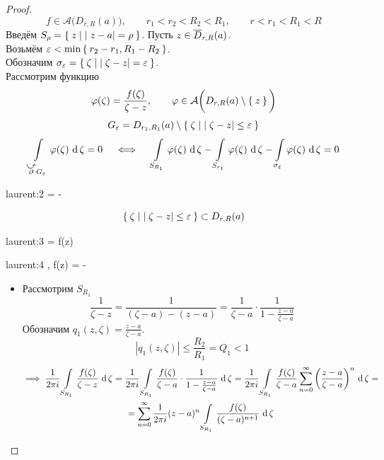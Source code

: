 \begin{proof}
	$$ f \in \mathcal A \bigg( D_{r, R}(a) \bigg), \qquad r_1 < r_2 < R_2 < R_1, \qquad r < r_1 < R_1 < R $$
	Введём $ S_\rho = \Set{ z \mid |z - a| = \rho} $.
	Пусть $ z \in \overline D_{r, R}(a) $. \\
	Возьмём $ \varepsilon < \min\Set{ r_2 - r_1, R_1 - R_2} $. \\
	Обозначим $ \sigma_\varepsilon = \Set{\zeta \mid |\zeta - z| = \varepsilon} $. \\
	Рассмотрим функцию
	$$ \varphi(\zeta) = \frac{f(\zeta)}{\zeta - z}, \qquad \varphi \in \mathcal A \bigg( D_{r, R}(a) \setminus \Set{z} \bigg) $$
	$$ G_\varepsilon = D_{r_1, R_1}(a) \setminus \Set{\zeta \mid |\zeta - z| \le \varepsilon} $$
	$$ \cint[\zeta]{\curvedir \partial G_\eps}{\vphi(\zeta)} = 0 \quad
	\iff \quad \cint[\zeta]{S_{R_1}}{\vphi(\zeta)} - \cint[\zeta]{S_{r_1}}{\vphi(\zeta)} - \cint[\zeta]{\sigma_\eps}{\vphi(\zeta)} = 0 $$
	\begin{equ}{laurent:2}
		\implies {}  =  - 
	\end{equ}
	$$ \Set{\zeta \mid |\zeta - z| \le \varepsilon} \subset D_{r, R}(a) $$
	\begin{equ}{laurent:3}
		 = f(z)
	\end{equ}
	\begin{equ}{laurent:4}
		,  \implies f(z) =   - 
	\end{equ}
	\begin{itemize}
		\item Рассмотрим $ S_{R_1} $
			$$ \frac1{\zeta - z} = \frac1{(\zeta - a) - (z - a)} = \frac1{\zeta - a} \cdot \frac1{1 - \frac{z - a}{\zeta - a}} $$
			Обозначим $ q_1(z, \zeta) = \frac{z - a}{\zeta - a} $.
			$$ |q_1(z, \zeta)| \le \frac{R_2}{R_1} = Q_1 < 1 $$
			\begin{multline}\lbl{laurent:6}
				\implies \frac1{2\pi i} \cint[\zeta]{S_{R_1}}{\frac{f(\zeta)}{\zeta - z}} = \frac1{2\pi i}\cint[\zeta]{S_{R_1}}{\frac{f(\zeta)}{\zeta - a} \cdot \frac1{1 - \frac{z - a}{\zeta - a}}} = \frac1{2\pi i}\cint[\zeta]{S_{R_1}}{\frac{f(\zeta)}{\zeta - a} \sum_{n = 0}^\infty \bigg( \frac{z - a}{\zeta - a} \bigg)^n} = \\
				= \sum_{n = 0}^\infty \frac1{2\pi i}(z - a)^n \cint[\zeta]{S_{R_1}}{\frac{f(\zeta)}{(\zeta - a)^{n + 1}}}

\end{multline}
\end{itemize}
\end{proof}

